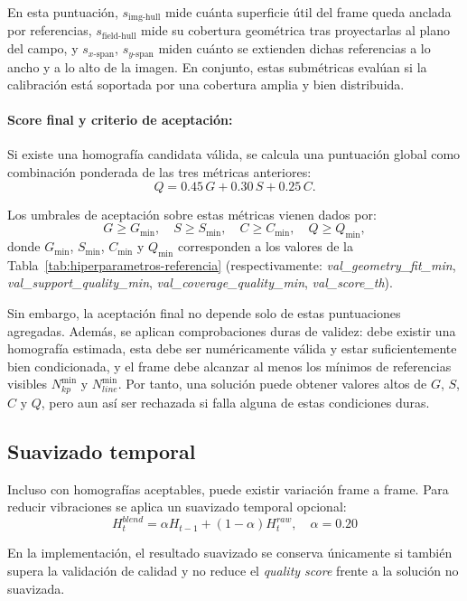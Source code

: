 En esta puntuación, \(s_{\text{img-hull}}\) mide cuánta superficie útil del frame queda anclada por referencias, \(s_{\text{field-hull}}\) mide su cobertura geométrica tras proyectarlas al plano del campo, y \(s_{x\text{-span}}\), \(s_{y\text{-span}}\) miden cuánto se extienden dichas referencias a lo ancho y a lo alto de la imagen. En conjunto, estas submétricas evalúan si la calibración está soportada por una cobertura amplia y bien distribuida.

\paragraph{Score final y criterio de aceptación:}

Si existe una homografía candidata válida, se calcula una puntuación global como combinación ponderada de las tres métricas anteriores:
\[
Q = 0.45\,G + 0.30\,S + 0.25\,C.
\]

Los umbrales de aceptación sobre estas métricas vienen dados por:
\[
G \ge G_{\min},\quad S \ge S_{\min},\quad C \ge C_{\min},\quad Q \ge Q_{\min},
\]
donde \(G_{\min}\), \(S_{\min}\), \(C_{\min}\) y \(Q_{\min}\) corresponden a los valores de la Tabla~\ref{tab:hiperparametros-referencia} (respectivamente: \textit{val\_geometry\_fit\_min}, \textit{val\_support\_quality\_min}, \textit{val\_coverage\_quality\_min}, \textit{val\_score\_th}).

Sin embargo, la aceptación final no depende solo de estas puntuaciones agregadas. Además, se aplican comprobaciones duras de validez: debe existir una homografía estimada, esta debe ser numéricamente válida y estar suficientemente bien condicionada, y el frame debe alcanzar al menos los mínimos de referencias visibles \(N_{kp}^{\min}\) y \(N_{line}^{\min}\). Por tanto, una solución puede obtener valores altos de \(G\), \(S\), \(C\) y \(Q\), pero aun así ser rechazada si falla alguna de estas condiciones duras.

\subsection{Suavizado temporal}

Incluso con homografías aceptables, puede existir variación frame a frame. Para reducir vibraciones se aplica un suavizado temporal opcional:
\[
H_t^{blend}=\alpha H_{t-1} + (1-\alpha)H_t^{raw}, \quad \alpha=0.20
\]

En la implementación, el resultado suavizado se conserva únicamente si también supera la validación de calidad y no reduce el \textit{quality score} frente a la solución no suavizada.

